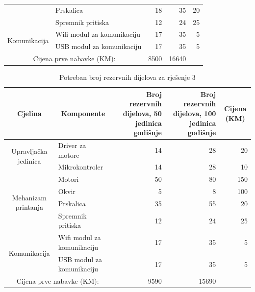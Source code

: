 \documentclass[12pt]{article}
\begin{document}
\begin{landscape}
\begin{table}[htbp]
\begin{tabular}{ccrrr}
          & \multicolumn{1}{l}{Prskalica} & 18    & 35    & 20 \\
          & \multicolumn{1}{l}{Spremnik pritiska} & 12    & 24    & 25 \\
    \midrule
    \multirow{2}[2]{*}{Komunikacija} & \multicolumn{1}{l}{Wifi modul za komunikaciju} & 17    & 35    & 5 \\
          & \multicolumn{1}{l}{USB modul za komunikaciju} & 17    & 35    & 5 \\
    \midrule
    \multicolumn{2}{c}{Cijena prve nabavke (KM):} & 8500  & 16640 &  \\
    \bottomrule
    \end{tabular}%
  \label{tab:addlabel}%
\end{table}%

\begin{table}[htbp]
  \centering
  \caption{Potreban broj rezervnih dijelova za rješenje 3}
    \begin{tabular}{ccrrr}
    \toprule
    Cjelina & Komponente & \multicolumn{1}{p{7.93em}}{Broj rezervnih \newline{}dijelova, 50 \newline{}jedinica godišnje} & \multicolumn{1}{p{8.285em}}{Broj rezervnih \newline{}dijelova, 100 \newline{}jedinica godišnje} & \multicolumn{1}{c}{Cijena (KM)} \\
    \midrule
    \multirow{2}[2]{*}{Upravljačka jedinica} & \multicolumn{1}{l}{Driver za motore} & 14    & 28    & 20 \\
          & \multicolumn{1}{l}{Mikrokontroler} & 14    & 28    & 10 \\
    \midrule
    \multirow{4}[2]{*}{Mehanizam printanja} & \multicolumn{1}{l}{Motori} & 50    & 80    & 150 \\
          & \multicolumn{1}{l}{Okvir} & 5     & 8     & 100 \\
          & \multicolumn{1}{l}{Prskalica} & 35    & 55    & 20 \\
          & \multicolumn{1}{l}{Spremnik pritiska} & 12    & 24    & 25 \\
    \midrule
    \multirow{2}[2]{*}{Komunikacija} & \multicolumn{1}{l}{Wifi modul za komunikaciju} & 17    & 35    & 5 \\
          & \multicolumn{1}{l}{USB modul za komunikaciju} & 17    & 35    & 5 \\
    \midrule
    \multicolumn{2}{c}{Cijena prve nabavke (KM):} & 9590  & 15690 &  \\
    \bottomrule
    \end{tabular}%
  \label{tab:addlabel}%
\end{table}%

\end{landscape}
\end{document}
